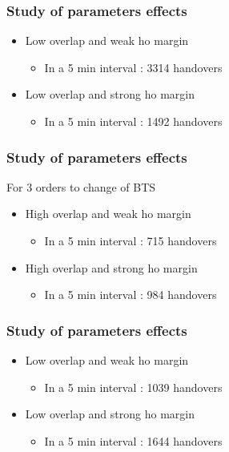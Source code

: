\documentclass{beamer}
\begin{document}
\begin{frame}
\frametitle{Study of parameters effects}

\begin{itemize}
 \item Low overlap and weak ho margin
  \begin{itemize}
    \item In a 5 min interval : 3314 handovers
  \end{itemize}
 \item Low overlap and strong ho margin
  \begin{itemize}
    \item In a 5 min interval : 1492 handovers
  \end{itemize}
\end{itemize}
\end{frame}

\begin{frame}
\frametitle{Study of parameters effects}

For 3 orders to change of BTS
\begin{itemize}
 \item High overlap and weak ho margin
  \begin{itemize}
    \item In a 5 min interval : 715 handovers
  \end{itemize}
 \item High overlap and strong ho margin
  \begin{itemize}
    \item In a 5 min interval : 984 handovers
  \end{itemize}
\end{itemize}
\end{frame}

\begin{frame}
\frametitle{Study of parameters effects}

\begin{itemize}
  \item Low overlap and weak ho margin
  \begin{itemize}
    \item In a 5 min interval : 1039 handovers
  \end{itemize}
  \item Low overlap and strong ho margin
  \begin{itemize}
    \item In a 5 min interval : 1644 handovers
  \end{itemize}
\end{itemize}
\end{frame}
\end{document}
